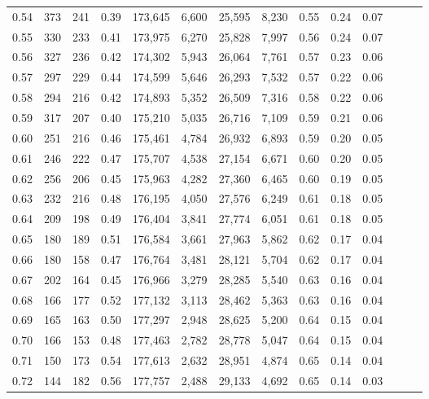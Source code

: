 \begin{tabular}{rrrrrrrrrrrrrr}
0.54 &     373 &  241 &  0.39 &  173,645 &    6,600 &  25,595 &   8,230 &  0.55 &  0.24 &      0.07 \\
0.55 &     330 &  233 &  0.41 &  173,975 &    6,270 &  25,828 &   7,997 &  0.56 &  0.24 &      0.07 \\
0.56 &     327 &  236 &  0.42 &  174,302 &    5,943 &  26,064 &   7,761 &  0.57 &  0.23 &      0.06 \\
0.57 &     297 &  229 &  0.44 &  174,599 &    5,646 &  26,293 &   7,532 &  0.57 &  0.22 &      0.06 \\
0.58 &     294 &  216 &  0.42 &  174,893 &    5,352 &  26,509 &   7,316 &  0.58 &  0.22 &      0.06 \\
0.59 &     317 &  207 &  0.40 &  175,210 &    5,035 &  26,716 &   7,109 &  0.59 &  0.21 &      0.06 \\
0.60 &     251 &  216 &  0.46 &  175,461 &    4,784 &  26,932 &   6,893 &  0.59 &  0.20 &      0.05 \\
0.61 &     246 &  222 &  0.47 &  175,707 &    4,538 &  27,154 &   6,671 &  0.60 &  0.20 &      0.05 \\
0.62 &     256 &  206 &  0.45 &  175,963 &    4,282 &  27,360 &   6,465 &  0.60 &  0.19 &      0.05 \\
0.63 &     232 &  216 &  0.48 &  176,195 &    4,050 &  27,576 &   6,249 &  0.61 &  0.18 &      0.05 \\
0.64 &     209 &  198 &  0.49 &  176,404 &    3,841 &  27,774 &   6,051 &  0.61 &  0.18 &      0.05 \\
0.65 &     180 &  189 &  0.51 &  176,584 &    3,661 &  27,963 &   5,862 &  0.62 &  0.17 &      0.04 \\
0.66 &     180 &  158 &  0.47 &  176,764 &    3,481 &  28,121 &   5,704 &  0.62 &  0.17 &      0.04 \\
0.67 &     202 &  164 &  0.45 &  176,966 &    3,279 &  28,285 &   5,540 &  0.63 &  0.16 &      0.04 \\
0.68 &     166 &  177 &  0.52 &  177,132 &    3,113 &  28,462 &   5,363 &  0.63 &  0.16 &      0.04 \\
0.69 &     165 &  163 &  0.50 &  177,297 &    2,948 &  28,625 &   5,200 &  0.64 &  0.15 &      0.04 \\
0.70 &     166 &  153 &  0.48 &  177,463 &    2,782 &  28,778 &   5,047 &  0.64 &  0.15 &      0.04 \\
0.71 &     150 &  173 &  0.54 &  177,613 &    2,632 &  28,951 &   4,874 &  0.65 &  0.14 &      0.04 \\
0.72 &     144 &  182 &  0.56 &  177,757 &    2,488 &  29,133 &   4,692 &  0.65 &  0.14 &      0.03 \\

\end{tabular}
